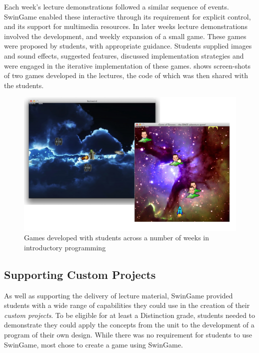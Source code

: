 Each week's lecture demonstrations followed a similar sequence of events. SwinGame enabled these interactive through its requirement for explicit control, and its support for multimedia resources. In later weeks lecture demonstrations involved the development, and weekly expansion of a small game. These games were proposed by students, with appropriate guidance. Students supplied images and sound effects, suggested features, discussed implementation strategies and were engaged in the iterative implementation of these games.  shows screen-shots of two games developed in the lectures, the code of which was then shared with the students.

\begin{figure}[thbp]
  \centering
  \includegraphics[width=\textwidth]{Games}
  \caption{Games developed with students across a number of weeks in introductory programming}
  \label{fig:games}
\end{figure}


\subsection{Supporting Custom Projects} %
\label{sub:supporting_custom_projects}

As well as supporting the delivery of lecture material, SwinGame provided students with a wide range of capabilities they could use in the creation of their \emph{custom projects}. To be eligible for at least a Distinction grade, students needed to demonstrate they could apply the concepts from the unit to the development of a program of their own design. While there was no requirement for students to use SwinGame, most chose to create a game using SwinGame.


